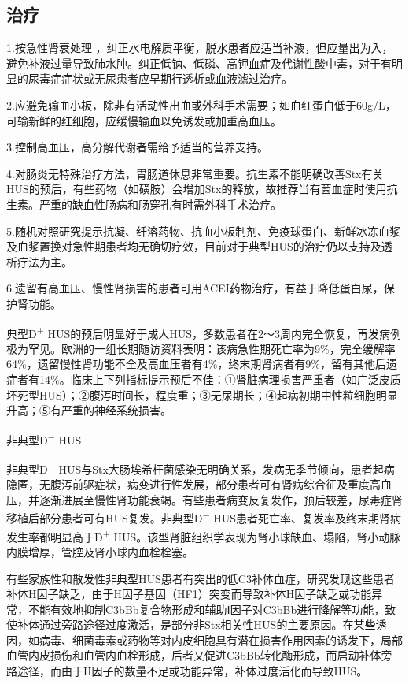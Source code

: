 \subsection{治疗}

1.按急性肾衰处理
，纠正水电解质平衡，脱水患者应适当补液，但应量出为入，避免补液过量导致肺水肿。纠正低钠、低磷、高钾血症及代谢性酸中毒，对于有明显的尿毒症症状或无尿患者应早期行透析或血液滤过治疗。

2.应避免输血小板，除非有活动性出血或外科手术需要；如血红蛋白低于60g/L，可输新鲜的红细胞，应缓慢输血以免诱发或加重高血压。

3.控制高血压，高分解代谢者需给予适当的营养支持。

4.对肠炎无特殊治疗方法，胃肠道休息非常重要。抗生素不能明确改善Stx有关HUS的预后，有些药物（如磺胺）会增加Stx的释放，故推荐当有菌血症时使用抗生素。严重的缺血性肠病和肠穿孔有时需外科手术治疗。

5.随机对照研究提示抗凝、纤溶药物、抗血小板制剂、免疫球蛋白、新鲜冰冻血浆及血浆置换对急性期患者均无确切疗效，目前对于典型HUS的治疗仍以支持及透析疗法为主。

6.遗留有高血压、慢性肾损害的患者可用ACEI药物治疗，有益于降低蛋白尿，保护肾功能。

典型D\textsuperscript{+}
HUS的预后明显好于成人HUS，多数患者在2～3周内完全恢复，再发病例极为罕见。欧洲的一组长期随访资料表明：该病急性期死亡率为9\%，完全缓解率64\%，遗留慢性肾功能不全及高血压者有4\%，终末期肾病者有9\%，留有其他后遗症者有14\%。临床上下列指标提示预后不佳：①肾脏病理损害严重者（如广泛皮质坏死型HUS）；②腹泻时间长，程度重；③无尿期长；④起病初期中性粒细胞明显升高；⑤有严重的神经系统损害。

\hypertarget{text00344.htmlux5cux23CHP13-5-4}{}
非典型D\textsuperscript{−} HUS

非典型D\textsuperscript{−}
HUS与Stx大肠埃希杆菌感染无明确关系，发病无季节倾向，患者起病隐匿，无腹泻前驱症状，病变进行性发展，部分患者可有肾病综合征及重度高血压，并逐渐进展至慢性肾功能衰竭。有些患者病变反复发作，预后较差，尿毒症肾移植后部分患者可有HUS复发。非典型D\textsuperscript{−}
HUS患者死亡率、复发率及终末期肾病发生率都明显高于D\textsuperscript{+}
HUS。该型肾脏组织学表现为肾小球缺血、塌陷，肾小动脉内膜增厚，管腔及肾小球内血栓栓塞。

有些家族性和散发性非典型HUS患者有突出的低C3补体血症，研究发现这些患者补体H因子缺乏，由于H因子基因（HF1）突变而导致补体H因子缺乏或功能异常，不能有效地抑制C3bBb复合物形成和辅助Ⅰ因子对C3bBb进行降解等功能，致使补体通过旁路途径过度激活，是部分非Stx相关性HUS的主要原因。在某些诱因，如病毒、细菌毒素或药物等对内皮细胞具有潜在损害作用因素的诱发下，局部血管内皮损伤和血管内血栓形成，后者又促进C3bBb转化酶形成，而启动补体旁路途径，而由于H因子的数量不足或功能异常，补体过度活化而导致HUS。

